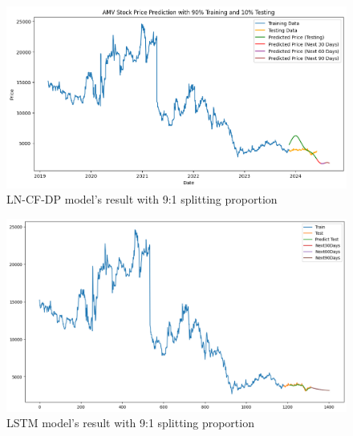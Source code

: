 \documentclass{ieeeojies}
\begin{document}
\begin{figure}[H]
  \centering
  \begin{minipage}{0.8\linewidth}
    \centering
    \includegraphics[width=\linewidth]{bibliography/Figure/AMV_LN_CF&DP.png}
    \caption{LN-CF-DP model's result with 9:1 splitting proportion}
    \label{fig8}
  \end{minipage}
\end{figure}

\begin{figure}[H]
  \centering
  \begin{minipage}{0.8\linewidth}
    \centering
    \includegraphics[width=\linewidth]{bibliography/Figure/AMV_LSTM_91.png}
    \caption{LSTM model's result with 9:1 splitting proportion}
    \label{fig8}
  \end{minipage}
\end{figure}
\end{document}
